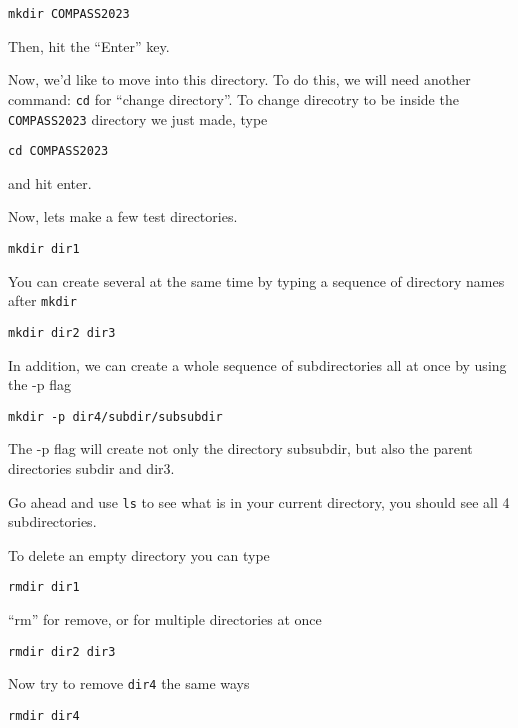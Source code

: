 \documentclass[aps,showpacs,prd,notitlepage,preprintnumbers,amsmath,amssymb,letterpaper]{revtex4}
\begin{document}
\begin{verbatim}
mkdir COMPASS2023
\end{verbatim}

Then, hit the ``Enter'' key.

Now, we'd like to move into this directory. To do this, we will need another command: \verb|cd| for ``change directory''.
To change direcotry to be inside the \verb|COMPASS2023| directory we just made, type

\begin{verbatim}
cd COMPASS2023
\end{verbatim}

and hit enter.

Now, lets make a few test directories.

\begin{verbatim}
mkdir dir1
\end{verbatim}

You can create several at the same time by typing a sequence of directory names after \verb|mkdir|

\begin{verbatim}
mkdir dir2 dir3
\end{verbatim}

In addition, we can create a whole sequence of subdirectories all at once by using the -p flag

\begin{verbatim}
mkdir -p dir4/subdir/subsubdir
\end{verbatim}

The -p flag will create not only the directory subsubdir, but also the parent directories subdir and dir3.

Go ahead and use \verb|ls| to see what is in your current directory, you should see all 4 subdirectories.

To delete an empty directory you can type

\begin{verbatim}
rmdir dir1
\end{verbatim}

``rm'' for remove, or for multiple directories at once

\begin{verbatim}
rmdir dir2 dir3
\end{verbatim}

Now try to remove \verb|dir4| the same ways

\begin{verbatim}
rmdir dir4
\end{verbatim}
\end{document}
